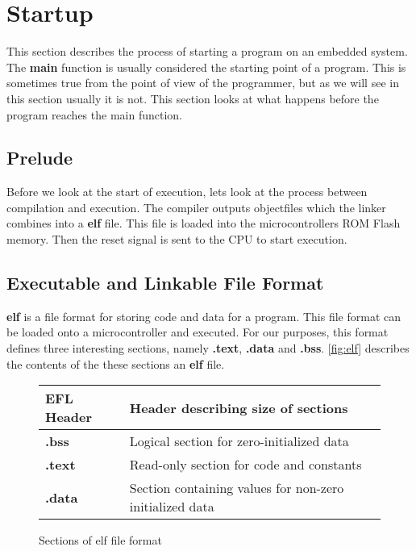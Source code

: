 \section{Startup}
\label{sec:back:startup}

This section describes the process of starting a program on an embedded system.
The \textbf{main} function is usually considered the starting point of a program.
This is sometimes true from the point of view of the programmer, but as we will see in this section usually it is not.
This section looks at what happens before the program reaches the main function.

\subsection{Prelude}

Before we look at the start of execution, lets look at the process between compilation and execution.
The compiler outputs objectfiles which the linker combines into a \textbf{elf} file.
This file is loaded into the microcontrollers ROM Flash memory.
Then the reset signal is sent to the CPU to start execution.

\subsection{Executable and Linkable File Format}
\label{sec:back:elf}
\textbf{elf} is a file format for storing code and data for a program.
This file format can be loaded onto a microcontroller and executed.
For our purposes, this format defines three interesting sections, namely \textbf{.text}, \textbf{.data} and \textbf{.bss}.
\autoref{fig:elf} describes the contents of the these sections an \textbf{elf} file.

\begin{figure}[H]
  \centering
  \begin{tabular}{|l|l|}
    \hline
    EFL Header & Header describing size of sections \\
    \hline
    \textbf{.bss} & Logical section for zero-initialized data \\
    \hline
    \textbf{.text} & Read-only section for code and constants \\
    \hline
    \textbf{.data} & Section containing values for non-zero initialized data \\
    \hline
  \end{tabular}
  \caption{Sections of elf file format}
  \label{fig:elf}
\end{figure}

